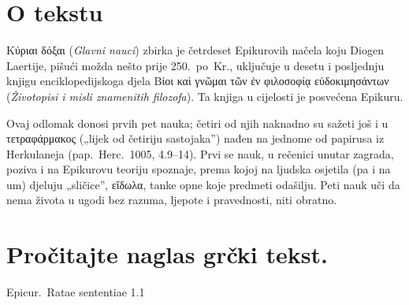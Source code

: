 
\section*{O tekstu}

\textgreek[variant=ancient]{Κύριαι δόξαι} (\textit{Glavni nauci}) zbirka je četrdeset Epikurovih načela koju Diogen Laertije, pišući možda nešto prije 250.\ po~Kr., uključuje u desetu i posljednju knjigu enciklopedijskoga djela \textgreek[variant=ancient]{Βίοι καὶ γνῶμαι τῶν ἐν φιλοσοφίᾳ εὐδοκιμησάντων} (\textit{Životopisi i misli znamenitih filozofa}). Ta knjiga u cijelosti je posvećena Epikuru.

Ovaj odlomak donosi prvih pet nauka; četiri od njih naknadno su sažeti još i u τετραφάρμακος („lijek od četiriju sastojaka”) nađen na jednome od papirusa iz Herkulaneja (pap.\ Herc.\ 1005, 4.9–14). Prvi se nauk, u rečenici unutar zagrada, poziva i na Epikurovu teoriju spoznaje, prema kojoj na ljudska osjetila (pa i na um) djeluju „sličice”, εἴδωλα, tanke opne koje predmeti odašilju. Peti nauk uči da nema života u ugodi bez razuma, ljepote i pravednosti, niti obratno.



\newpage

\section*{Pročitajte naglas grčki tekst.}

Epicur.\ Ratae sententiae 1.1


\medskip



